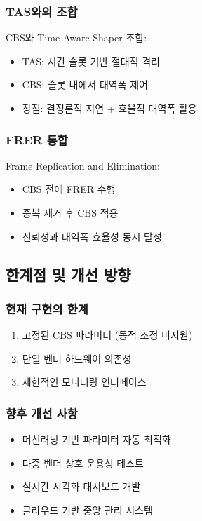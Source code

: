 \documentclass[twocolumn,10pt]{article}
\begin{document}
\subsubsection{TAS와의 조합}

CBS와 Time-Aware Shaper 조합:

\begin{itemize}
    \item TAS: 시간 슬롯 기반 절대적 격리
    \item CBS: 슬롯 내에서 대역폭 제어
    \item 장점: 결정론적 지연 + 효율적 대역폭 활용
\end{itemize}

\subsubsection{FRER 통합}

Frame Replication and Elimination:

\begin{itemize}
    \item CBS 전에 FRER 수행
    \item 중복 제거 후 CBS 적용
    \item 신뢰성과 대역폭 효율성 동시 달성
\end{itemize}

\subsection{한계점 및 개선 방향}

\subsubsection{현재 구현의 한계}

\begin{enumerate}
    \item 고정된 CBS 파라미터 (동적 조정 미지원)
    \item 단일 벤더 하드웨어 의존성
    \item 제한적인 모니터링 인터페이스
\end{enumerate}

\subsubsection{향후 개선 사항}

\begin{itemize}
    \item 머신러닝 기반 파라미터 자동 최적화
    \item 다중 벤더 상호 운용성 테스트
    \item 실시간 시각화 대시보드 개발
    \item 클라우드 기반 중앙 관리 시스템
\end{itemize}
\end{document}
